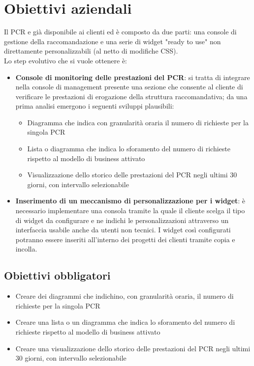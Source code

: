 \documentclass[a4paper, 12pt, twoside, openright]{book}
\begin{document}
\section{Obiettivi aziendali}
Il PCR e già disponibile ai clienti ed è composto da due parti: una console di gestione della raccomandazione e una serie di widget "ready to use" non direttamente personalizzabili (al netto di modifiche CSS).\\
Lo step evolutivo che si vuole ottenere è:
\begin{itemize}
\item \textbf{Console di monitoring delle prestazioni del PCR}: si tratta di integrare nella console di management presente una sezione che consente al cliente di verificare le prestazioni di erogazione della struttura raccomandativa; da una prima analisi emergono i seguenti sviluppi plausibili:
	\begin{itemize}
	\item Diagramma che indica con granularità oraria il numero di richieste per la singola PCR
	\item Lista o diagramma che indica lo sforamento del numero di richieste rispetto al modello di business attivato
	\item Visualizzazione dello storico delle prestazioni del PCR negli ultimi 30 giorni, con intervallo selezionabile
	\end{itemize}
\item \textbf{Inserimento di un meccanismo di personalizzazione per i widget}: è necessario implementare una consola tramite la quale il cliente scelga il tipo di widget da configurare e ne indichi le personalizzazioni attraverso un interfaccia usabile anche da utenti non tecnici. I widget così configurati potranno essere inseriti all'interno dei progetti dei clienti tramite copia e incolla.
\end{itemize}

\subsection{Obiettivi obbligatori}
\begin{itemize}
\item Creare dei diagrammi che indichino, con granularità oraria, il numero di richieste per la singola PCR
\item Creare una lista o un diagramma che indica lo sforamento del numero di richieste rispetto al modello di business attivato
\item Creare una visualizzazione dello storico delle prestazioni del PCR negli ultimi 30 giorni, con intervallo selezionabile
\end{itemize}
\end{document}
